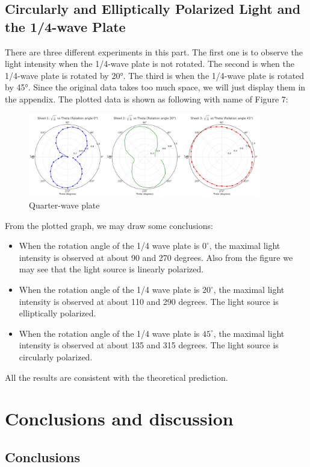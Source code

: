 \documentclass[12pt, a4paper, oneside]{article}
\begin{document}
\subsection{Circularly and Elliptically Polarized Light and the 1/4-wave Plate}
\indent

There are three different experiments in this part. The first one is to observe the light intensity when the 1/4-wave plate is not rotated. 
The second is when the 1/4-wave plate is rotated by 20°. The third is when the 1/4-wave plate is rotated by 45°.
Since the original data takes too much space, we will just display them in the appendix. The plotted data is shown as following with name of Figure 7:
\begin{figure}
	\centering
	\includegraphics[width=0.9\textwidth]{QuarterWave_Result.png}
	\caption{Quarter-wave plate}
	\label{fig7}
\end{figure} 
From the plotted graph, we may draw some conclusions:
\begin{itemize}
	\item When the rotation angle of the 1/4 wave plate is $0^\circ$, the maximal light intensity is observed at about 90 and 270 degrees. Also from the figure we may see that the light source is linearly polarized.
	\item When the rotation angle of the 1/4 wave plate is $20^\circ$, the maximal light intensity is observed at about 110 and 290 degrees. The light source is elliptically polarized.
	\item When the rotation angle of the 1/4 wave plate is $45^\circ$, the maximal light intensity is observed at about 135 and 315 degrees. The light source is circularly polarized.
\end{itemize}
All the results are consistent with the theoretical prediction.

\section{Conclusions and discussion}
\subsection{Conclusions}
\indent
\end{document}
